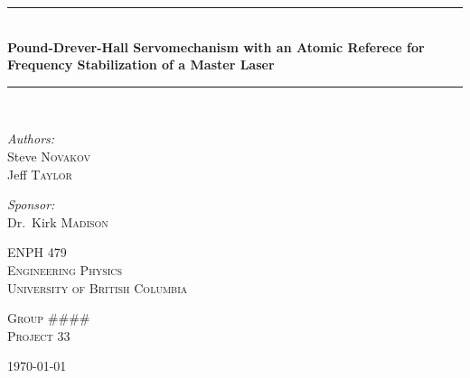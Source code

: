 \documentclass[10.5pt, a4paper, twoside]{article}
\newcommand{\HRule}{\rule{\linewidth}{0.5mm}}
\begin{document}
%
%

\begin{titlepage}
\begin{center}


\HRule \\[0.4cm]
{ \huge \bfseries Pound-Drever-Hall Servomechanism with an Atomic Referece for Frequency Stabilization of a Master Laser \\[0.4cm] }

\HRule \\[2.5cm]

\begin{minipage}{0.4\textwidth}
\begin{flushleft} \Large
\Large \emph{Authors:}\\
Steve \textsc{Novakov} \\
Jeff \textsc{Taylor}
\end{flushleft}
\end{minipage}
\begin{minipage}{0.4\textwidth}
\begin{flushright} \Large
\emph{Sponsor:} \\
Dr.~Kirk \textsc{Madison}
\end{flushright}
\end{minipage}

\vfill

\textsc{\LARGE ENPH 479}\\[0.3cm]
\textsc{\LARGE Engineering Physics}\\[0.3cm]
\textsc{\LARGE University of British Columbia}\\[0.3cm]

\vfill

\textsc{\Large Group \#\#\#\#}\\[0.3cm]
\textsc{\Large Project 33}\\[0.3cm]

\vfill

{\large \today}

\end{center}
\end{titlepage}
\newpage
\end{document}
